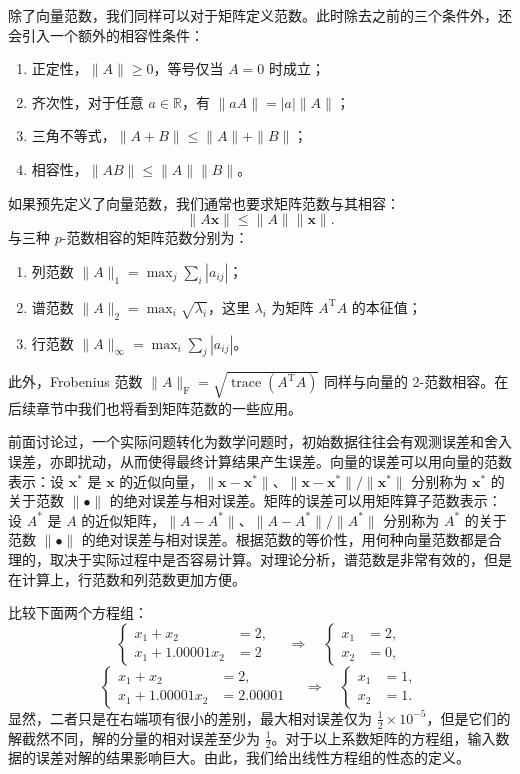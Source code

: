 除了向量范数，我们同样可以对于矩阵定义范数。此时除去之前的三个条件外，还会引入一个额外的相容性条件：
\begin{enumerate}
\item 正定性，$\|A\|\ge0$，等号仅当 $A=0$ 时成立；
\item 齐次性，对于任意 $a\in\mathbb R$，有 $\|aA\|=|a|\|A\|$；
\item 三角不等式，$\|A+B\|\le\|A\|+\|B\|$；
\item 相容性，$\|AB\|\le\|A\|\|B\|$。
\end{enumerate}
如果预先定义了向量范数，我们通常也要求矩阵范数与其相容：
\begin{equation}
\|A\bm x\|\le\|A\|\|\bm x\|.
\tag{3.2.14}
\end{equation}
与三种 $p$-范数相容的矩阵范数分别为：
\begin{enumerate}
\item 列范数 $\|A\|_1=\max_j\sum_i|a_{ij}|$；
\item 谱范数 $\|A\|_2=\max_i\sqrt{\lambda_i}$，这里 $\lambda_i$ 为矩阵 $A^{\mathrm T}A$ 的本征值；
\item 行范数 $\|A\|_\infty=\max_i\sum_j|a_{ij}|$。
\end{enumerate}
此外，Frobenius 范数 $\|A\|_{\mathrm F}=\sqrt{\operatorname{trace}(A^{\mathrm T}A)}$ 同样与向量的 2-范数相容。在后续章节中我们也将看到矩阵范数的一些应用。

前面讨论过，一个实际问题转化为数学问题时，初始数据往往会有观测误差和舍入误差，亦即扰动，从而使得最终计算结果产生误差。向量的误差可以用向量的范数表示：设 $\bm x^*$ 是 $\bm x$ 的近似向量，$\|\bm x-\bm x^*\|$、$\|\bm x-\bm x^*\|/\|\bm x^*\|$ 分别称为 $\bm x^*$ 的关于范数 $\|\bullet\|$ 的绝对误差与相对误差。矩阵的误差可以用矩阵算子范数表示：设 $A^*$ 是 $A$ 的近似矩阵，$\|A-A^*\|$、$\|A-A^*\|/\|A^*\|$ 分别称为 $A^*$ 的关于范数 $\|\bullet\|$ 的绝对误差与相对误差。根据范数的等价性，用何种向量范数都是合理的，取决于实际过程中是否容易计算。对理论分析，谱范数是非常有效的，但是在计算上，行范数和列范数更加方便。

比较下面两个方程组：
\[
\left\{\begin{aligned}
x_1+x_2&=2,\\
x_1+1.00001x_2&=2
\end{aligned}\right.
\quad\Longrightarrow\quad
\left\{\begin{aligned}x_1&=2,\\x_2&=0,
\end{aligned}\right.
\]
\[
\left\{\begin{aligned}
x_1+x_2&=2,\\
x_1+1.00001x_2&=2.00001
\end{aligned}\right.
\quad\Longrightarrow\quad
\left\{\begin{aligned}x_1&=1,\\x_2&=1.
\end{aligned}\right.
\]
显然，二者只是在右端项有很小的差别，最大相对误差仅为 $\frac12\times10^{-5}$，但是它们的解截然不同，解的分量的相对误差至少为 $\frac12$。对于以上系数矩阵的方程组，输入数据的误差对解的结果影响巨大。由此，我们给出线性方程组的性态的定义。

